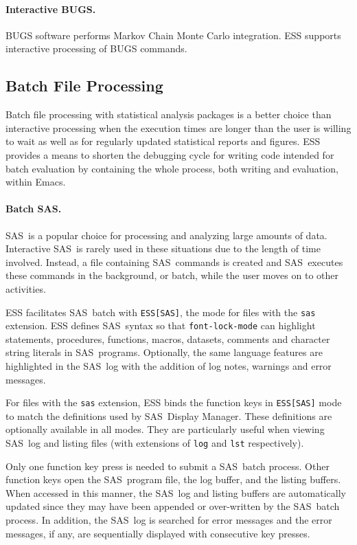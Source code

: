 \documentclass{article}
\newcommand*{\SAS}{\textsc{SAS}}
\newcommand{\stexttt}[1]{{\small\texttt{#1}}}
\begin{document}
\paragraph{Interactive BUGS.}
BUGS software performs Markov Chain Monte Carlo integration.  ESS
supports interactive processing of BUGS commands.

\subsection{Batch File Processing}
\label{sec:batch-file}

Batch file processing with statistical analysis packages is a better
choice than interactive processing when the execution times are longer
than the user is willing to wait as well as for regularly updated
statistical reports and figures.  ESS provides a means to shorten the
debugging cycle for writing code intended for batch evaluation by
containing the whole process, both writing and evaluation, within
Emacs.

\paragraph{Batch \SAS.}
\label{sec:sas-batch}

\SAS\ is a popular choice for processing and analyzing large amounts
of data.  Interactive \SAS\ is rarely used in these
situations due to the length of time involved.  Instead, a file
containing \SAS\ commands is created and \SAS\ executes these commands
in the background, or batch, while the user moves on to other
activities.

ESS facilitates \SAS\ batch with \stexttt{ESS[SAS]}, the mode for
files with the \stexttt{sas} extension.  ESS defines \SAS\ syntax so
that \stexttt{font-lock-mode} can highlight statements, procedures,
functions, macros, datasets, comments and character string literals in
\SAS\ programs.  Optionally, the same language features are
highlighted in the \SAS\ log with the addition of log notes, warnings
and error messages.

For files with the \stexttt{sas} extension, ESS binds the function
keys in \stexttt{ESS[SAS]} mode to match the definitions used by \SAS\
Display Manager.  These definitions are optionally available in all
modes.  They are particularly useful when viewing \SAS\ log and
listing files (with extensions of \stexttt{log} and \stexttt{lst}
respectively).

Only one function key press is needed to submit a \SAS\ batch process.
Other function keys open the \SAS\ program file, the log buffer, and
the listing buffers.  When accessed in this manner, the \SAS\ log and
listing buffers are automatically updated since they may have
been appended or over-written by the \SAS\ batch process.  In
addition, the \SAS\ log is searched for error messages and the error
messages, if any, are sequentially displayed with consecutive key
presses.
\end{document}
